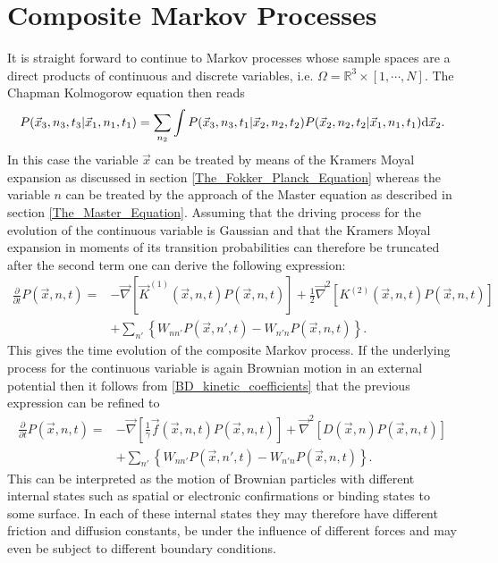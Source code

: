 \section{Composite Markov Processes}
\label{Multivariate_Markov_Processes}
It is straight forward to continue to Markov processes whose sample spaces are a direct products of continuous and discrete variables, i.e. $\Omega = \mathbb{R}^{3} \times [1,\cdots, N]$. The Chapman Kolmogorow equation then reads
\begin{equation}
    P(\vec{x}_3,n_3,t_3|\vec{x}_1,n_1,t_1) = \sum_{n_2} \int P(\vec{x}_3,n_3,t_1|\vec{x}_2,n_2,t_2)P(\vec{x}_2,n_2,t_2|\vec{x}_1,n_1,t_1) {\rm d} \vec{x}_2.
    \label{MCK}
\end{equation}
In this case the variable $\vec{x}$ can be treated by means of the Kramers Moyal expansion as discussed in section \ref{The_Fokker_Planck_Equation} whereas the variable $n$ can be treated by the approach of the Master equation as described in section \ref{The_Master_Equation}. Assuming that the driving process for the evolution of the continuous variable is Gaussian and that the Kramers Moyal expansion in moments of its transition probabilities can therefore be truncated after the second term one can derive the following expression:
\begin{align}
    \frac{\partial}{\partial t } P(\vec{x},n,t) =   &- \vec{ \nabla } \left[\vec{K}^{(1)}(\vec{x},n,t)P(\vec{x},n,t) \right] + \frac{1}{2}\vec{\nabla}^{2}\left[ K^{(2)}(\vec{x},n,t)P(\vec{x},n,t) \right] \nonumber \\
                                                    &+ \sum_{n'} \left\{ W_{nn'}P(\vec{x},n',t) - W_{n'n}P(\vec{x},n,t)\right\}.
    \label{composite_mp}
\end{align}
This gives the time evolution of the composite Markov process. If the underlying process for the continuous variable is again Brownian motion in an external potential then it follows from \eqref{BD_kinetic_coefficients} that the previous expression can be refined to
\begin{align}
    \frac{\partial}{\partial t } P(\vec{x},n,t) =   &- \vec{ \nabla } \left[\frac{1}{\gamma}\vec{f}(\vec{x},n,t)P(\vec{x},n,t) \right] +\vec{\nabla}^{2}\left[ D(\vec{x},n)P(\vec{x},n,t) \right] \nonumber \\
                                                    &+ \sum_{n'} \left\{ W_{nn'}P(\vec{x},n',t) - W_{n'n}P(\vec{x},n,t)\right\}.
    \label{fpmeq1}
\end{align}
This can be interpreted as the motion of Brownian particles with different internal states such as spatial or electronic confirmations or binding states to some surface. In each of these internal states they may therefore have different friction and diffusion constants, be under the influence of different forces and may even be subject to different boundary conditions. \\
